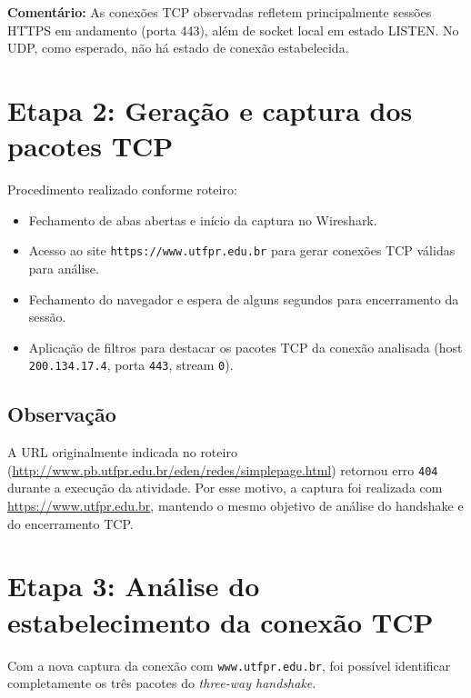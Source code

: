 \documentclass[12pt,a4paper]{article}
\begin{document}
\textbf{Comentário:} As conexões TCP observadas refletem principalmente sessões HTTPS em andamento (porta 443), além de socket local em estado LISTEN. No UDP, como esperado, não há estado de conexão estabelecida.

\section*{Etapa 2: Geração e captura dos pacotes TCP}

Procedimento realizado conforme roteiro:
\begin{itemize}
\item Fechamento de abas abertas e início da captura no Wireshark.
\item Acesso ao site \texttt{https://www.utfpr.edu.br} para gerar conexões TCP válidas para análise.
\item Fechamento do navegador e espera de alguns segundos para encerramento da sessão.
\item Aplicação de filtros para destacar os pacotes TCP da conexão analisada (host \texttt{200.134.17.4}, porta \texttt{443}, stream \texttt{0}).
\end{itemize}

\subsection*{Observação}
A URL originalmente indicada no roteiro (\url{http://www.pb.utfpr.edu.br/eden/redes/simplepage.html}) retornou erro \texttt{404} durante a execução da atividade. Por esse motivo, a captura foi realizada com \url{https://www.utfpr.edu.br}, mantendo o mesmo objetivo de análise do handshake e do encerramento TCP.

\section*{Etapa 3: Análise do estabelecimento da conexão TCP}

Com a nova captura da conexão com \texttt{www.utfpr.edu.br}, foi possível identificar completamente os três pacotes do \textit{three-way handshake}.
\end{document}

